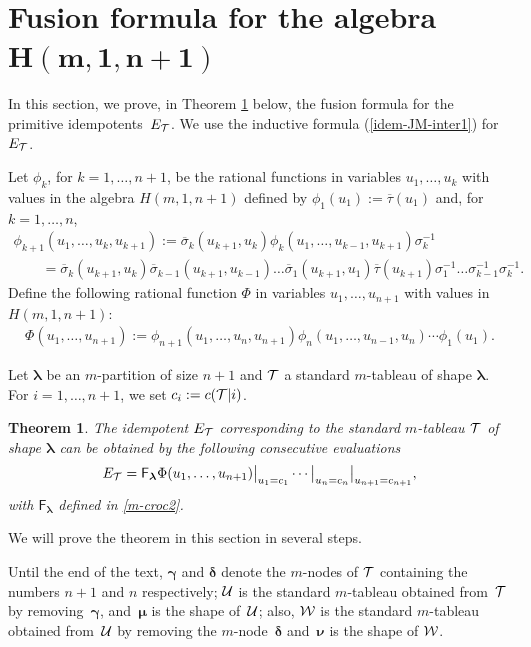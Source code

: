 \documentclass[pdftex]{sigma}
\newcommand{\bsi}{{\overline{\sigma}}}
\newcommand{\bta}{{\overline{\tau}}}
\newcommand{\lam}{\boldsymbol{\lambda}}
\newcommand{\num}{\boldsymbol{\nu}}
\newcommand{\mum}{\boldsymbol{\mu}}
\newcommand{\gam}{\boldsymbol{\gamma}}
\newcommand{\dem}{\boldsymbol{\delta}}
\newtheorem{Theorem}{Theorem}
\begin{document}
\section[Fusion formula for the algebra $H(m,1,n+1)$]{Fusion formula for the algebra $\boldsymbol{H(m,1,n+1)}$}\label{sec-fus}

In this section, we prove, in Theorem \ref{prop-fus1} below, the fusion formula for the primitive idempo\-tents~$E_{{\cal{T}}}$. We use the inductive formula (\ref{idem-JM-inter1}) for $E_{{\cal{T}}}$.


Let $\phi_{k}$, for $k=1,\dots,n+1$, be the rational functions in variables $u_1,\dots,u_k$ with values in the algebra $H(m,1,n+1)$ def\/ined by
$\phi_{1}(u_1):=\bta(u_1)$ and, for $k=1,\dots,n$,
 \begin{gather*}\phi_{k+1}(u_1,\dots,u_k,u_{k+1}):=
\bsi_k(u_{k+1},u_k)\phi_{k}(u_1,\dots,u_{k-1},u_{k+1})\sigma_k^{-1}\\
\qquad {} =   \bsi_{k}(u_{k+1},u_k)\bsi_{k-1}(u_{k+1},u_{k-1})\dots \bsi_{1}(u_{k+1},u_1)\bta(u_{k+1})\sigma_1^{-1}\dots \sigma_{k-1}^{-1}\sigma_k^{-1}  . \end{gather*}
Def\/ine the following rational function $\Phi$ in variables $u_1,\dots,u_{n+1}$ with values in $H(m,1,n+1)$:
\begin{gather*}%
\Phi(u_1,\dots,u_{n+1}):=
\phi_{n+1}(u_1,\dots,u_n,u_{n+1})
\phi_{n}(u_1,\dots,u_{n-1},u_{n}) \cdots \phi_{1}(u_1) .
\end{gather*}


Let $\lam$ be an $m$-partition of size $n+1$ and ${\cal{T}}$ a standard $m$-tableau of shape $\lam$. For $i=1,\dots,n+1$, we set $c_i:=c({\cal{T}}|i)$.

\begin{Theorem}\label{prop-fus1}
The idempotent $E_{{\cal{T}}}$ corresponding to the standard $m$-tableau ${\cal{T}}$ of shape $\lam$ can be obtained by the following consecutive evaluations
\begin{gather*}%
E_{{\cal{T}}}=\mathsf{F}_{\lam}\Phi(u_1,\dots,u_{n+1})\bigr\rvert_{u_1=c_1}\cdots\bigr\rvert_{u_n=c_n}\bigr\rvert_{u_{n+1}=c_{n+1}}  ,
\end{gather*}
with $\mathsf{F}_{\lam}$ defined in \eqref{m-croc2}.
\end{Theorem}

We will prove the theorem in this section in several steps.


Until the end of the text, $\gam$ and $\dem$
denote the $m$-nodes of $\cal{T}$ containing the numbers $n+1$ and $n$  respectively; ${\cal{U}}$ is the standard $m$-tableau obtained from~${\cal{T}}$ by removing~$\gam$, and~$\mum$ is the shape of~${\cal{U}}$; also, ${\cal{W}}$ is the standard $m$-tableau obtained from~${\cal{U}}$ by removing the $m$-node~$\dem$ and~$\num$ is the shape of ${\cal{W}}$.
\end{document}
